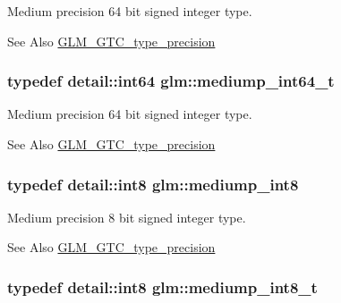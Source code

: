 Medium precision 64 bit signed integer type. \begin{DoxySeeAlso}{See Also}
\hyperlink{group__gtc__type__precision}{G\-L\-M\-\_\-\-G\-T\-C\-\_\-type\-\_\-precision} 
\end{DoxySeeAlso}
\hypertarget{group__gtc__type__precision_ga555a2f85641550c232db473a9bb981f7}{
\subsubsection[{mediump\-\_\-int64\-\_\-t}]{\setlength{\rightskip}{0pt plus 5cm}typedef detail\-::int64 {\bf glm\-::mediump\-\_\-int64\-\_\-t}}}\label{group__gtc__type__precision_ga555a2f85641550c232db473a9bb981f7}
Medium precision 64 bit signed integer type. \begin{DoxySeeAlso}{See Also}
\hyperlink{group__gtc__type__precision}{G\-L\-M\-\_\-\-G\-T\-C\-\_\-type\-\_\-precision} 
\end{DoxySeeAlso}
\hypertarget{group__gtc__type__precision_ga3ee8faab2278c44c5785af04b7b18a14}{
\subsubsection[{mediump\-\_\-int8}]{\setlength{\rightskip}{0pt plus 5cm}typedef detail\-::int8 {\bf glm\-::mediump\-\_\-int8}}}\label{group__gtc__type__precision_ga3ee8faab2278c44c5785af04b7b18a14}
Medium precision 8 bit signed integer type. \begin{DoxySeeAlso}{See Also}
\hyperlink{group__gtc__type__precision}{G\-L\-M\-\_\-\-G\-T\-C\-\_\-type\-\_\-precision} 
\end{DoxySeeAlso}
\hypertarget{group__gtc__type__precision_ga626ac5f73d3538e62a879d6c56abfb36}{
\subsubsection[{mediump\-\_\-int8\-\_\-t}]{\setlength{\rightskip}{0pt plus 5cm}typedef detail\-::int8 {\bf glm\-::mediump\-\_\-int8\-\_\-t}}}\label{group__gtc__type__precision_ga626ac5f73d3538e62a879d6c56abfb36}
